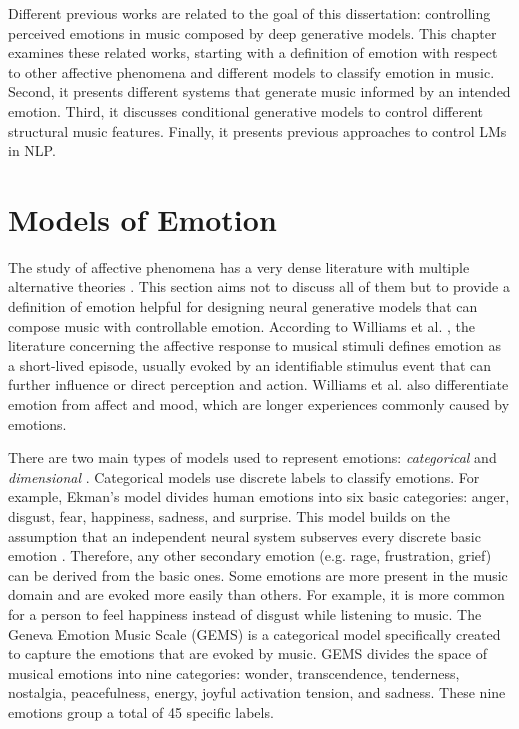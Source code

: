 Different previous works are related to the goal of this dissertation: controlling perceived emotions in music composed by deep generative models. This chapter examines these related works, starting with a definition of emotion with respect to other affective phenomena and different models to classify emotion in music. Second, it presents different systems that generate music informed by an intended emotion. Third, it discusses conditional generative models to control different structural music features. Finally, it presents previous approaches to control LMs in NLP.

\section{Models of Emotion}

The study of affective phenomena has a very dense literature with multiple alternative theories \cite{ekkekakis2013measurement}. This section aims not to discuss all of them but to provide a definition of emotion helpful for designing neural generative models that can compose music with controllable emotion.  According to Williams et al. \cite{williams2015investigating}, the literature concerning the affective response to musical stimuli defines emotion as a short-lived episode, usually evoked by an identifiable stimulus event that can further influence or direct perception and action. Williams et al. \cite{williams2015investigating} also differentiate emotion from affect and mood, which are longer experiences commonly caused by emotions.

There are two main types of models used to represent emotions: \emph{categorical} and \emph{dimensional} \cite{eerola2011comparison}. Categorical models use discrete labels to classify emotions. For example, Ekman's model \cite{ekman1992argument} divides human emotions into six basic categories: anger, disgust, fear, happiness, sadness, and surprise. This model builds on the assumption that an independent neural system subserves every discrete basic emotion \cite{eerola2011comparison}. Therefore, any other secondary emotion (e.g. rage, frustration, grief) can be derived from the basic ones. Some emotions are more present in the music domain and are evoked more easily than others. For example, it is more common for a person to feel happiness instead of disgust while listening to music. The Geneva Emotion Music Scale (GEMS) \cite{zentner2008emotions} is a categorical model specifically created to capture the emotions that are evoked by music. GEMS divides the space of musical emotions into nine categories: wonder, transcendence, tenderness, nostalgia, peacefulness, energy, joyful activation tension, and sadness. These nine emotions group a total of 45 specific labels.

